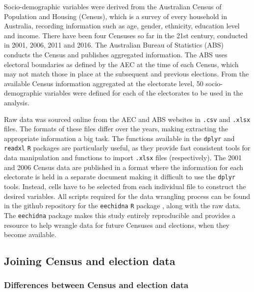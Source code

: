 \documentclass[times, doublespace]{anzsauth}
\begin{document}
Socio-demographic variables were derived from the Australian Census of Population and Housing (Census), which is a survey of every household in Australia, recording information such as age, gender, ethnicity, education level and income. There have been four Censuses so far in the 21st century, conducted in 2001, 2006, 2011 and 2016. The Australian Bureau of Statistics (ABS) conducts the Census and publishes aggregated information. The ABS uses electoral boundaries as defined by the AEC at the time of each Census, which may not match those in place at the subsequent and previous elections. From the available Census information aggregated at the electorate level, 50 socio-demographic variables were defined for each of the electorates to be used in the analysis.

Raw data was sourced online from the AEC and ABS websites in \texttt{.csv} and \texttt{.xlsx} files. The formats of these files differ over the years, making extracting the appropriate information a big task. The functions available in the \texttt{dplyr} \citep{dplyr} and \texttt{readxl} \citep{readxl} \texttt{R} packages are particularly useful, as they provide fast consistent tools for data manipulation and functions to import \texttt{.xlsx} files (respectively). The 2001 and 2006 Census data are published in a format where the information for each electorate is held in a separate document making it difficult to use the \texttt{dplyr} tools. Instead, cells have to be selected from each individual file to construct the desired variables. All scripts required for the data wrangling process can be found in the github repository for the \texttt{eechidna} \texttt{R} package \citep{eechidna}, along with the raw data. The \texttt{eechidna} package makes this study entirely reproducible and provides a resource to help wrangle data for future Censuses and elections, when they become available.

\hypertarget{joining-census-and-election-data}{%
\subsection{Joining Census and election data}\label{joining-census-and-election-data}}

\hypertarget{differences-between-census-and-election-data}{%
\subsubsection*{Differences between Census and election data}\label{differences-between-census-and-election-data}}
\end{document}
